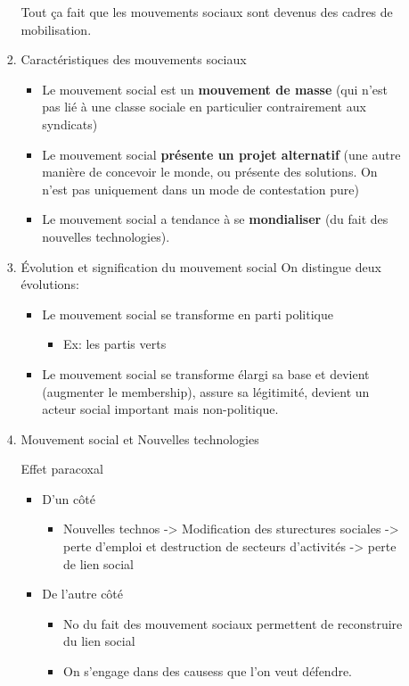 \documentclass[11pt]{article}
\begin{document}
\begin{enumerate}
\begin{enumerate}
\begin{enumerate}
Tout ça fait que les mouvements sociaux sont devenus des cadres de mobilisation.
\item Caractéristiques des mouvements sociaux
\label{sec:orge098649}
\begin{itemize}
\item Le mouvement social est un \textbf{mouvement de masse} (qui n'est pas lié à une classe
sociale en particulier contrairement aux syndicats)
\item Le mouvement social \textbf{présente un projet alternatif} (une autre manière de
concevoir le monde, ou présente des solutions. On n'est pas uniquement dans un
mode de contestation pure)
\item Le mouvement social a tendance à se \textbf{mondialiser} (du fait des nouvelles technologies).
\end{itemize}
\item Évolution et signification du mouvement social
\label{sec:orga1b1dbd}
On distingue deux évolutions:
\begin{itemize}
\item Le mouvement social se transforme en parti politique
\begin{itemize}
\item Ex: les partis verts
\end{itemize}
\item Le mouvement social se transforme élargi sa base et devient (augmenter le
membership), assure sa légitimité, devient un acteur social important mais
non-politique.
\end{itemize}
\item Mouvement social et Nouvelles technologies
\label{sec:org4af98cb}

Effet paracoxal

\begin{itemize}
\item D'un côté
\begin{itemize}
\item Nouvelles technos -> Modification des sturectures sociales -> perte d'emploi
et destruction de secteurs d'activités -> perte de lien social
\end{itemize}

\item De l'autre côté
\begin{itemize}
\item No du fait des mouvement sociaux permettent de reconstruire du lien social
\item On s'engage dans des causess que l'on veut défendre.
\end{itemize}
\end{itemize}
\end{enumerate}
\end{enumerate}
\end{enumerate}
\end{document}
